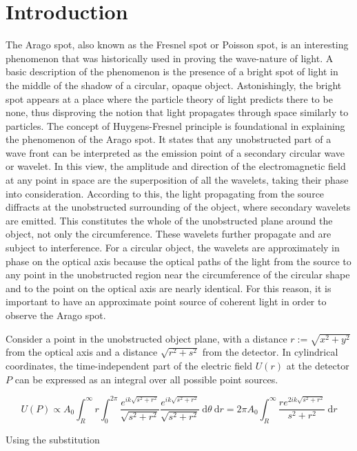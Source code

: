 \documentclass[11pt,a4paper]{article}
\begin{document}
\section{Introduction}
The Arago spot, also known as the Fresnel spot or Poisson spot, is an interesting phenomenon that was historically used in proving the wave-nature of light. A basic description of the phenomenon is the presence of a bright spot of light in the middle of the shadow of a circular, opaque object. Astonishingly, the bright spot appears at a place where the particle theory of light predicts there to be none, thus disproving the notion that light propagates through space similarly to particles. 
The concept of Huygens-Fresnel principle is foundational in explaining the phenomenon of the Arago spot. It states that any unobstructed part of a wave front can be interpreted as the emission point of a secondary circular wave or wavelet. In this view, the amplitude and direction of the electromagnetic field at any point in space are the superposition of all the wavelets, taking their phase into consideration. 
According to this, the light propagating from the source diffracts at the unobstructed surrounding of the object, where secondary wavelets are emitted. This constitutes the whole of the unobstructed plane around the object, not only the circumference. These wavelets further propagate and are subject to interference. For a circular object, the wavelets are approximately in phase on the optical axis because the optical paths of the light from the source to any point in the unobstructed region near the circumference of the circular shape and to the point on the optical axis are nearly identical. For this reason, it is important to have an approximate point source of coherent light in order to observe the Arago spot.

Consider a point in the unobstructed object plane, with a distance ${ r := \sqrt{x^{2} + y^{2}} }$ from the optical axis and a distance ${ \sqrt{r^{2} + s^{2}} }$ from the detector. In cylindrical coordinates, the time-independent part of the electric field ${ U(r) }$ at the detector ${ P }$ can be expressed as an integral over all possible point sources.

$$U(P) \propto A_{0} \int_{R}^{\infty} r \int_{0}^{2\pi} \frac{e^{ik\sqrt{s^{2} + r^{2}}}}{\sqrt{s^{2} + r^{2}}} \frac{e^{ik\sqrt{s^{2} + r^{2}}}}{\sqrt{s^{2} + r^{2}}} \ \mathrm{d}\theta \ \mathrm{d}r = 2\pi A_{0} \int_{R}^{\infty} \frac{re^{2ik\sqrt{s^{2} + r^{2}}}}{s^{2} + r^{2}} \ \mathrm{d}r$$

Using the substitution
\end{document}

